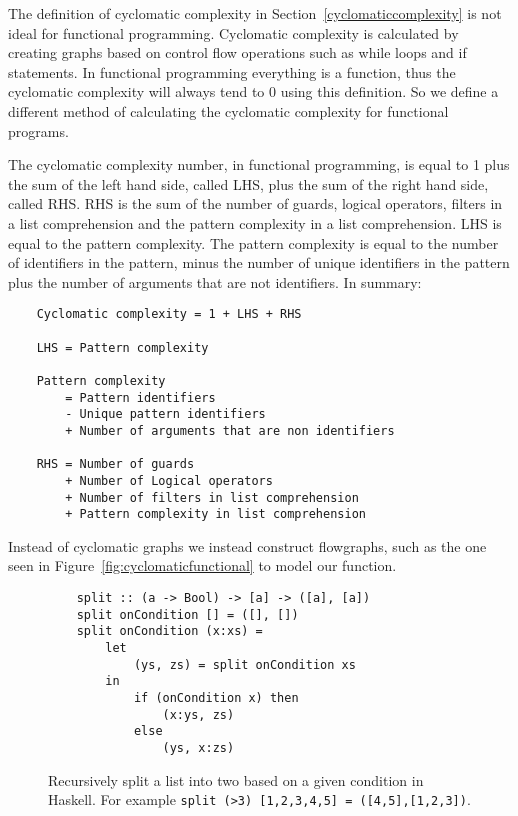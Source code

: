 The definition of cyclomatic complexity in Section~\ref{cyclomaticcomplexity} is
not ideal for functional programming. Cyclomatic complexity is calculated by
creating graphs based on control flow operations such as while loops and if
statements. In functional programming everything is a function, thus the
cyclomatic complexity will always tend to 0 using this definition. So we define
a different method of calculating the cyclomatic complexity for functional
programs. 

\theoremstyle{definition} 
    \begin{definition} 
    The cyclomatic complexity number, in functional programming, is equal to
    1 plus the sum of the left hand side, called LHS, plus the sum of the
    right hand side, called RHS. RHS is the sum of the number of guards,
    logical operators, filters in a list comprehension and the pattern
    complexity in a list comprehension. LHS is equal to the pattern
    complexity.  The pattern complexity is equal to the number of
    identifiers in the pattern, minus the number of unique identifiers in
    the pattern plus the number of arguments that are not identifiers. In
    summary:

    \begin{lstlisting}
    Cyclomatic complexity = 1 + LHS + RHS

    LHS = Pattern complexity 

    Pattern complexity   
        = Pattern identifiers 
        - Unique pattern identifiers 
        + Number of arguments that are non identifiers

    RHS = Number of guards 
        + Number of Logical operators 
        + Number of filters in list comprehension 
        + Pattern complexity in list comprehension
    \end{lstlisting}
\end{definition}

Instead of cyclomatic graphs we instead construct flowgraphs, such as the one
seen in Figure~\ref{fig:cyclomaticfunctional} to model our function.

\begin{figure}[H]
    \begin{lstlisting}
    split :: (a -> Bool) -> [a] -> ([a], [a])
    split onCondition [] = ([], [])
    split onCondition (x:xs) =
        let 
            (ys, zs) = split onCondition xs
        in 
            if (onCondition x) then 
                (x:ys, zs)
            else 
                (ys, x:zs)
    \end{lstlisting}
    \caption{Recursively split a list into two based on a given condition in
    Haskell. For example \texttt{split (>3) [1,2,3,4,5] =
    ([4,5],[1,2,3])}.}
    \label{split}
\end{figure}

